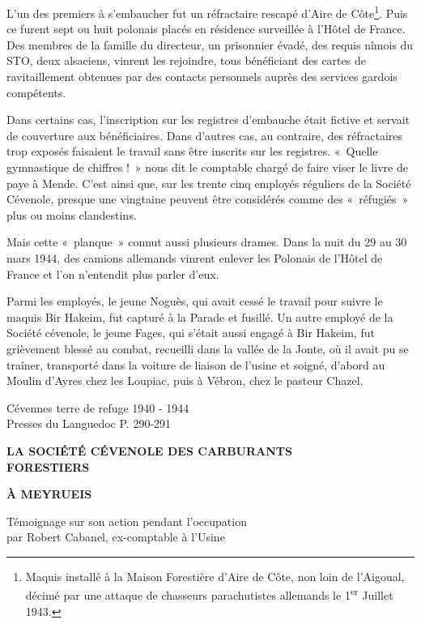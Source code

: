 L’un des premiers à s’embaucher fut un réfractaire rescapé d’Aire de Côte\footnote{Maquis
installé à la Maison Forestière d’Aire de Côte, non loin de l’Aigoual, décimé par une
attaque de chasseurs parachutistes allemands le 1\textsuperscript{er} Juillet 1943.}.
Puis ce furent sept ou huit polonais placés en résidence surveillée à l’Hôtel de France.
Des membres de la famille du directeur, un prisonnier évadé, des requis nîmois du STO,
deux alsaciens, vinrent les rejoindre, tous bénéficiant des cartes de ravitaillement
obtenues par des contacts personnels auprès des services gardois compétents.

Dans certains cas, l’inscription sur les registres d’embauche était fictive et servait de
couverture aux bénéficiaires. Dans d’autres cas, au contraire, des réfractaires trop
exposés faisaient le travail sans être inscrits sur les registres. «~Quelle gymnastique
de chiffres !~» nous dit le comptable chargé de faire viser le livre de paye à Mende.
C’est ainsi que, sur les trente cinq employés réguliers de la Société Cévenole,
presque une vingtaine peuvent être considérés comme des «~réfugiés~» plus ou moins
clandestins.

Mais cette «~planque~» connut aussi plusieurs drames. Dans la nuit du 29 au 30 mars
1944, des camions allemands vinrent enlever les Polonais de l’Hôtel de France et
l’on n’entendit plus parler d’eux.

Parmi les employés, le jeune Noguès, qui avait cessé le travail pour suivre le maquis
Bir Hakeim, fut capturé à la Parade et fusillé. Un autre employé de la Société
cévenole, le jeune Fages, qui s’était aussi engagé à Bir Hakeim, fut grièvement
blessé au combat, recueilli dans la vallée de la Jonte, où il avait pu se traîner,
transporté dans la voiture de liaison de l’usine et soigné, d’abord au Moulin d’Ayres
chez les Loupiac, puis à Vébron, chez le pasteur Chazel.

\begin{flushright}
Cévennes terre de refuge 1940 - 1944\\
Presses du Languedoc P. 290-291
\end{flushright}

\clearpage

\begin{center}
    {\Large\bfseries
    LA SOCIÉTÉ CÉVENOLE DES CARBURANTS\\
    FORESTIERS
    }

    \vspace{0.7cm}

    {\Large\bfseries
    À MEYRUEIS
    }

    \vspace{0.9cm}

    Témoignage sur son action pendant l’occupation\\
    par Robert Cabanel, ex-comptable à l’Usine
\end{center}


